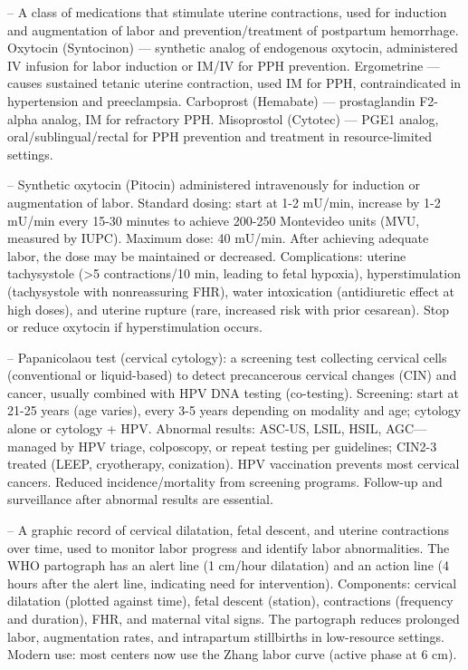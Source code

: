 -- A class of medications that stimulate uterine contractions, used for induction and augmentation of labor and prevention/treatment of postpartum hemorrhage. Oxytocin (Syntocinon) — synthetic analog of endogenous oxytocin, administered IV infusion for labor induction or IM/IV for PPH prevention. Ergometrine — causes sustained tetanic uterine contraction, used IM for PPH, contraindicated in hypertension and preeclampsia. Carboprost (Hemabate) — prostaglandin F2-alpha analog, IM for refractory PPH. Misoprostol (Cytotec) — PGE1 analog, oral/sublingual/rectal for PPH prevention and treatment in resource-limited settings.

-- Synthetic oxytocin (Pitocin) administered intravenously for induction or augmentation of labor. Standard dosing: start at 1-2 mU/min, increase by 1-2 mU/min every 15-30 minutes to achieve 200-250 Montevideo units (MVU, measured by IUPC). Maximum dose: 40 mU/min. After achieving adequate labor, the dose may be maintained or decreased. Complications: uterine tachysystole (>5 contractions/10 min, leading to fetal hypoxia), hyperstimulation (tachysystole with nonreassuring FHR), water intoxication (antidiuretic effect at high doses), and uterine rupture (rare, increased risk with prior cesarean). Stop or reduce oxytocin if hyperstimulation occurs.

-- Papanicolaou test (cervical cytology): a screening test collecting cervical cells (conventional or liquid-based) to detect precancerous cervical changes (CIN) and cancer, usually combined with HPV DNA testing (co-testing). Screening: start at 21-25 years (age varies), every 3-5 years depending on modality and age; cytology alone or cytology + HPV. Abnormal results: ASC-US, LSIL, HSIL, AGC—managed by HPV triage, colposcopy, or repeat testing per guidelines; CIN2-3 treated (LEEP, cryotherapy, conization). HPV vaccination prevents most cervical cancers. Reduced incidence/mortality from screening programs. Follow-up and surveillance after abnormal results are essential.

-- A graphic record of cervical dilatation, fetal descent, and uterine contractions over time, used to monitor labor progress and identify labor abnormalities. The WHO partograph has an alert line (1 cm/hour dilatation) and an action line (4 hours after the alert line, indicating need for intervention). Components: cervical dilatation (plotted against time), fetal descent (station), contractions (frequency and duration), FHR, and maternal vital signs. The partograph reduces prolonged labor, augmentation rates, and intrapartum stillbirths in low-resource settings. Modern use: most centers now use the Zhang labor curve (active phase at 6 cm).

